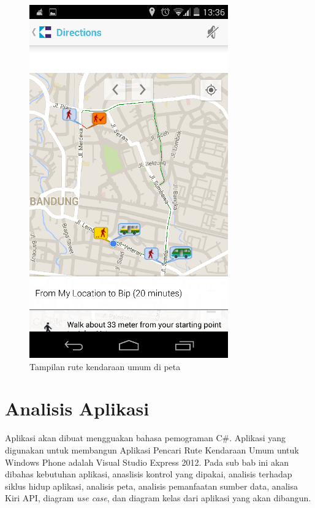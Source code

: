 \begin{figure}[h]
	\centering
		\includegraphics[scale=0.5]{Gambar/KIRI_Android/tampilan_peta}
	\caption{Tampilan rute kendaraan umum di peta}
	\label{fig:peta}
\end{figure}

\clearpage

\section{Analisis Aplikasi}
\label{lab:Analisis Aplikasi}
\hspace{0.5cm} Aplikasi akan dibuat mengguakan bahasa pemograman C\#. Aplikasi yang digunakan untuk membangun Aplikasi Pencari Rute Kendaraan Umum untuk Windows Phone adalah Visual Studio Express 2012. Pada sub bab ini akan dibahas kebutuhan aplikasi, anaslisis kontrol yang dipakai, analisis terhadap siklus hidup aplikasi, analisis peta, analisis pemanfaatan sumber data, analisa Kiri API, diagram \textit{use case}, dan diagram kelas dari aplikasi yang akan dibangun. 

